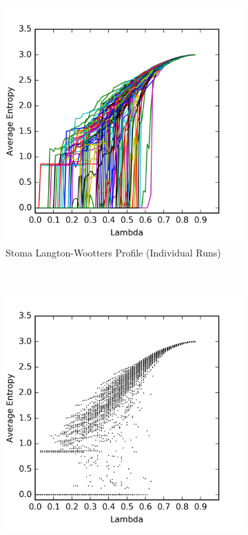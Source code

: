 \documentclass[a4paper,11pt]{article}
\begin{document}
\begin{figure}[htp]
\centering
\begin{subfigure}[t]{0.65\textwidth}
  \includegraphics[width=\textwidth]{ch6_figs/stoma_entropy}
  \caption{Stoma Langton-Wootters Profile (Individual Runs)}
  \label{fig:stoma_lw_run}
\end{subfigure}
~
\begin{subfigure}[t]{0.65\textwidth}
  \centering
  \includegraphics[width=\textwidth]{ch6_figs/stoma_entropy_scatter}

\end{subfigure}
\end{figure}
\end{document}
